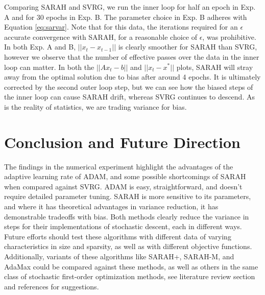 \documentclass[letterpaper,11 pt]{article}
\begin{document}
Comparing SARAH and SVRG, we run the inner loop for half an epoch  in Exp. A and for 30 epochs in Exp. B.  The parameter choice in Exp. B adheres with Equation \ref{eq:sarvar}. Note that for this data, the iterations required for an $\epsilon$ accurate convergence with SARAH, for a reasonable choice of $\epsilon$, was prohibitive. In both Exp. A and B, $||x_t - x_{t-1}||$ is clearly smoother for SARAH than SVRG, however we observe that the number of effective passes over the data in the inner loop can matter. In both the $||Ax_t-b||$ and $||x_t-x^*||$ plots, SARAH will stray away from the optimal solution due to bias after around 4 epochs.  It is ultimately corrected by the second outer loop step, but we can see how the biased steps of the inner loop can cause SARAH drift, whereas SVRG continues to descend. As is the reality of statistics, we are trading variance for bias.


\section{Conclusion and Future Direction}
The findings in the numerical experiment highlight the advantages of the adaptive learning rate of ADAM, and some possible shortcomings of SARAH when compared against SVRG. ADAM is easy, straightforward, and doesn't require detailed parameter tuning. SARAH is more sensitive to its parameters, and where it has theoretical advantages in variance reduction, it has demonstrable tradeoffs with bias. Both methods clearly reduce the variance in steps for their implementations of stochastic descent, each in different ways.  Future efforts should test these algorithms with different data of varying characteristics in size and sparsity, as well as with different objective functions. Additionally, variants of these algorithms like SARAH+, SARAH-M, and AdaMax could be compared against these methods, as well as others in the same class of stochastic first-order optimization methods, see literature review section and references for suggestions.
\end{document}
